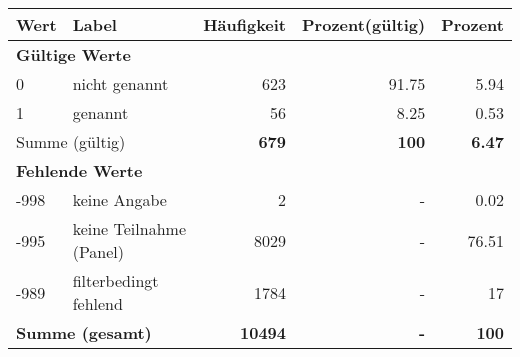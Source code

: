      \begin{longtable}{lXrrr}
     \toprule
     \textbf{Wert} & \textbf{Label} & \textbf{Häufigkeit} & \textbf{Prozent(gültig)} & \textbf{Prozent} \\
     \endhead
     \midrule
     \multicolumn{5}{l}{\textbf{Gültige Werte}}\\

     0 &
     \multicolumn{1}{X}{ nicht genannt   } &


       \num{623} &
       \num[round-mode=places,round-precision=2]{91,75} &
         \num[round-mode=places,round-precision=2]{5,94} \\

     1 &
     \multicolumn{1}{X}{ genannt   } &


       \num{56} &
       \num[round-mode=places,round-precision=2]{8,25} &
         \num[round-mode=places,round-precision=2]{0,53} \\
     \midrule
     \multicolumn{2}{l}{Summe (gültig)} &
       \textbf{\num{679}} &
     \textbf{100} &
       \textbf{\num[round-mode=places,round-precision=2]{6,47}} \\
     \multicolumn{5}{l}{\textbf{Fehlende Werte}}\\
       -998 &
       keine Angabe &
         \num{2} &
        - &
         \num[round-mode=places,round-precision=2]{0,02} \\
       -995 &
       keine Teilnahme (Panel) &
         \num{8029} &
        - &
         \num[round-mode=places,round-precision=2]{76,51} \\
       -989 &
       filterbedingt fehlend &
         \num{1784} &
        - &
         \num[round-mode=places,round-precision=2]{17} \\
     \midrule
     \multicolumn{2}{l}{\textbf{Summe (gesamt)}} &
          \textbf{\num{10494}} &
        \textbf{-} &
        \textbf{100} \\
     \bottomrule
     \end{longtable}
     
